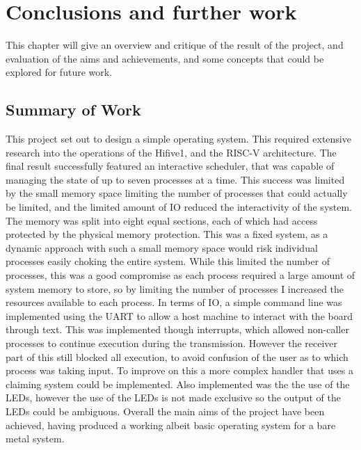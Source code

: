 \chapter[Conclusions and further work]{Conclusions and further work}
\label{cha:conc}
This chapter will give an overview and critique of the result of the project, and evaluation of the aims and achievements, and some concepts that could be explored for future work.  
\section{Summary of Work}
This project set out to design a simple operating system. This required extensive research into the operations of the Hifive1, and the RISC-V architecture. The final result successfully featured an interactive scheduler, that was capable of managing the state of up to seven processes at a time. This success was limited by the small memory space limiting the number of processes that could actually be limited, and the limited amount of IO reduced the interactivity of the system. The memory was split into eight equal sections, each of which had access protected by the physical memory protection. This was a fixed system, as a dynamic approach with such a small memory space would risk individual processes easily choking the entire system. While this limited the number of processes, this was a good compromise as each process required a large amount of system memory to store, so by limiting the number of processes I increased the resources available to each process. In terms of IO, a simple command line was implemented using the UART to allow a host machine to interact with the board through text. This was implemented though interrupts, which allowed non-caller processes to continue execution during the transmission. However the receiver part of this still blocked all execution, to avoid confusion of the user as to which process was taking input. To improve on this a more complex handler that uses a claiming system could be implemented. Also implemented was the the use of the LEDs, however the use of the LEDs is not made exclusive so the output of the LEDs could be ambiguous. Overall the main aims of the project have been achieved, having produced a working albeit basic operating system for a bare metal system. 

